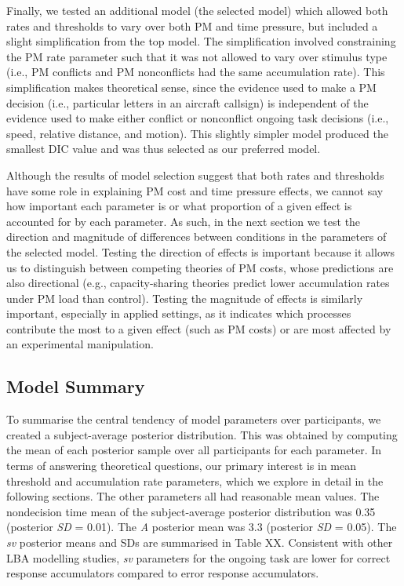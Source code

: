 \documentclass[11pt,]{article}
\begin{document}
Finally, we tested an additional model (the selected model) which
allowed both rates and thresholds to vary over both PM and time
pressure, but included a slight simplification from the top model. The
simplification involved constraining the PM rate parameter such that it
was not allowed to vary over stimulus type (i.e., PM conflicts and PM
nonconflicts had the same accumulation rate). This simplification makes
theoretical sense, since the evidence used to make a PM decision (i.e.,
particular letters in an aircraft callsign) is independent of the
evidence used to make either conflict or nonconflict ongoing task
decisions (i.e., speed, relative distance, and motion). This slightly
simpler model produced the smallest DIC value and was thus selected as
our preferred model.

Although the results of model selection suggest that both rates and
thresholds have some role in explaining PM cost and time pressure
effects, we cannot say how important each parameter is or what
proportion of a given effect is accounted for by each parameter. As
such, in the next section we test the direction and magnitude of
differences between conditions in the parameters of the selected model.
Testing the direction of effects is important because it allows us to
distinguish between competing theories of PM costs, whose predictions
are also directional (e.g., capacity-sharing theories predict lower
accumulation rates under PM load than control). Testing the magnitude of
effects is similarly important, especially in applied settings, as it
indicates which processes contribute the most to a given effect (such as
PM costs) or are most affected by an experimental manipulation.

\subsection{Model Summary}\label{model-summary}

To summarise the central tendency of model parameters over participants,
we created a subject-average posterior distribution. This was obtained
by computing the mean of each posterior sample over all participants for
each parameter. In terms of answering theoretical questions, our primary
interest is in mean threshold and accumulation rate parameters, which we
explore in detail in the following sections. The other parameters all
had reasonable mean values. The nondecision time mean of the
subject-average posterior distribution was 0.35 (posterior \emph{SD} =
0.01). The \emph{A} posterior mean was 3.3 (posterior \emph{SD} = 0.05).
The \emph{sv} posterior means and SDs are summarised in Table XX.
Consistent with other LBA modelling studies, \emph{sv} parameters for
the ongoing task are lower for correct response accumulators compared to
error response accumulators.
\end{document}
